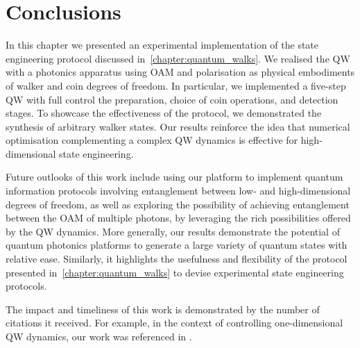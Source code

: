 \section{Conclusions}
\label{sec:expQWs:conclusions}

In this chapter we presented an experimental implementation of the state engineering protocol discussed in~\cref{chapter:quantum_walks}. We realised the QW with a photonics apparatus using \ac{OAM} and polarisation as physical embodiments of walker and coin degrees of freedom.
In particular, we implemented a five-step \ac{QW} with full control the preparation, choice of coin operations, and detection stages. To showcase the effectiveness of the protocol, we demonstrated the synthesis of arbitrary walker states.
Our results reinforce the idea that numerical optimisation complementing a complex \ac{QW} dynamics is effective for high-dimensional state engineering.

Future outlooks of this work include using our platform to implement quantum information protocols involving entanglement between low- and high-dimensional degrees of freedom, as well as exploring the possibility of achieving entanglement between the OAM of multiple photons, by leveraging the rich possibilities offered by the QW dynamics.
More generally, our results demonstrate the potential of quantum photonics platforms to generate a large variety of quantum states with relative ease. Similarly, it highlights the usefulness and flexibility of the protocol presented in~\cref{chapter:quantum_walks} to devise experimental state engineering protocols.

The impact and timeliness of this work is demonstrated by the number of citations it received. For example, in the context of controlling one-dimensional QW dynamics, our work was referenced in \cite{singh2019computational,panahiyan2020onedimensional,panahiyan2019increasing,panahiyan2018controlling,badhani2019gravitationally,mendonça2020emergent,gratsea2020generation}.
